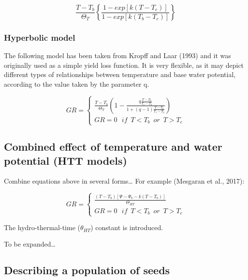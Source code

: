 \documentclass[a4paper,12pt]{article}
\begin{document}
\begin{equation}
\frac{T - T_b}{\Theta_T} \left\{ \frac{1 - exp \left[ k (T - T_c) \right]}{1 - exp \left[ k (T_b - T_c) \right]}  \right\}  
\end{equation}

\subsubsection{Hyperbolic model}\label{hyperbolic-model}

The following model has been taken from Kropff and Laar (1993) and it
was originally used as a simple yield loss function. It is very
flexible, as it may depict different types of relationships between
temperature and base water potential, according to the value taken by
the parameter q.

\begin{equation}
GR = \left\{ {\begin{array}{*{20}{l}}
\frac{T - T_b}{\Theta_T} \left( 1 - \frac{q \frac{T-T_b}{T_c- T_b} }{1 + (q-1) \frac{T-T_b}{T_c- T_b}}  \right) \\
GR = 0 \,\,\,\, if \,\,\, T < T_b \,\,\, or \,\,\, T > T_c
\end{array}} \right.
\end{equation}

\subsection{Combined effect of temperature and water potential (HTT
models)}\label{combined-effect-of-temperature-and-water-potential-htt-models}

Combine equations above in several forms\ldots{} For example (Mesgaran
et al., 2017):

\[GR = \left\{ {\begin{array}{*{20}{l}}
\frac{(T - T_b) \left[ \Psi - \Psi_b - k (T - T_b) \right]}{\Theta_{HT}}  \\
GR = 0 \,\,\,\, if \,\,\, T < T_b \,\,\, or \,\,\, T > T_c
\end{array}} \right.\]

The hydro-thermal-time (\(\theta_{HT}\)) constant is introduced.

To be expanded\ldots{}

\subsection{Describing a population of
seeds}\label{describing-a-population-of-seeds}
\end{document}
